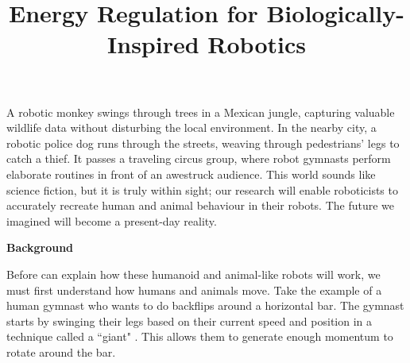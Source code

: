 \documentclass[a4paper,12pt]{article}
\begin{document}
\title{Energy Regulation for Biologically-Inspired Robotics}
\author{}
\date{}
\maketitle

\vspace{-1.2cm} %

A robotic monkey swings through trees in a Mexican jungle, capturing valuable
wildlife data without disturbing the local environment. 
In the nearby city, a robotic police dog runs through the streets, weaving through
pedestrians' legs to catch a thief.
It passes a traveling circus group, where robot gymnasts perform elaborate
routines in front of an awestruck audience.
This world sounds like science fiction, but it is truly within sight;
our research will enable roboticists to accurately recreate human and animal
behaviour in their robots.
The future we imagined will become a present-day reality.

\begin{large}
\textbf{Background}
\end{large}

Before can explain how these humanoid and animal-like robots will work, we
must first understand how humans and animals move. 
Take the example of a human gymnast who  wants to do backflips around a
horizontal bar. 
The gymnast starts by swinging their legs based on their current speed and
position in a technique called a ``giant" \cite{usagym_giant}. 
This allows them to generate enough momentum to rotate around the bar.
\end{document}
